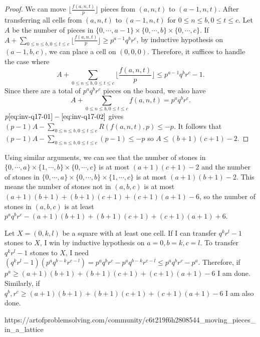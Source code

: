 {    \begin{proof}
        We can move $\lfloor \frac{f(a,n,t)}{p} \rfloor$ pieces from $(a,n,t)$ to $(a-1,n,t)$. After transferring all cells from $(a,n,t)$ to $(a-1,n,t)$ for $0\le n\le b, 0\le t\le c$.  
        Let $A$ be the number of pieces in $\{0,\cdots,a-1\} \times \{0,\cdots,b\} \times \{0,\cdots,c\}$. If $A+\sum\limits_{0\le n\le b, 0\le t\le c} \lfloor \frac{f(a,n,t)}{p} \rfloor \ge p^{a-1}q^br^c$, by inductive hypothesis on $(a-1,b,c)$, we can place a cell on $(0,0,0)$. Therefore, it suffices to handle the case where
        \begin{equation}
            \label{eq:inv-q17-01}
A+\sum\limits_{0\le n\le b, 0\le t\le c} \lfloor \frac{f(a,n,t)}{p} \rfloor \le p^{a-1}q^br^c-1.
        \end{equation}
        Since there are a total of $p^aq^br^c$ pieces on the board, we also have
        \begin{equation}
            \label{eq:inv-q17-02}
            A+\sum\limits_{0\le n\le b, 0\le t\le c} f(a,n,t) =p^aq^br^c.
        \end{equation}
        $p\ref{eq:inv-q17-01}-\ref{eq:inv-q17-02}$ gives $(p-1)A - \sum_{0\le n\le b, 0\le t\le c} R(f(a,n,t),p) \le -p$.  
        It follows that $(p-1)A - \sum_{0\le n\le b, 0\le t\le c} (p-1) \le -p$ so $A\le (b+1)(c+1)-2$.
    \end{proof}
    Using similar arguments, we can see that the number of stones in $\{0,\cdots,a\} \times \{1,\cdots,b\} \times \{0,\cdots,c\}$ is at most $(a+1)(c+1)-2$ and the number of stones in $\{0,\cdots,a\} \times \{0,\cdots,b\} \times \{1,\cdots,c\}$ is at most $(a+1)(b+1)-2$. This means the number of stones not in $(a,b,c)$ is at most $(a+1)(b+1)+(b+1)(c+1)+(c+1)(a+1)-6$, so the number of stones in $(a,b,c)$ is at least $p^aq^br^c -(a+1)(b+1)+(b+1)(c+1)+(c+1)(a+1) + 6$.

    Let $X=(0,k,l)$ be a square with at least one cell. If I can transfer $q^kr^l-1$ stones to $X$, I win by inductive hypothesis on $a=0, b=k, c=l$. To transfer $q^kr^l-1$ stones to $X$, I need $(q^kr^l-1)(p^aq^{b-k}r^{c-l}) = p^aq^br^c - p^aq^{b-k}r^{c-l} \le p^aq^br^c-p^a$. Therefore, if $p^a\ge (a+1)(b+1)+(b+1)(c+1)+(c+1)(a+1)-6$ I am done. Similarly, if $q^b, r^c\ge (a+1)(b+1)+(b+1)(c+1)+(c+1)(a+1)-6$ I am also done.
    }{%
    https://artofproblemsolving.com/community/c6t219f6h2808544_moving_pieces_in_a_lattice
}
